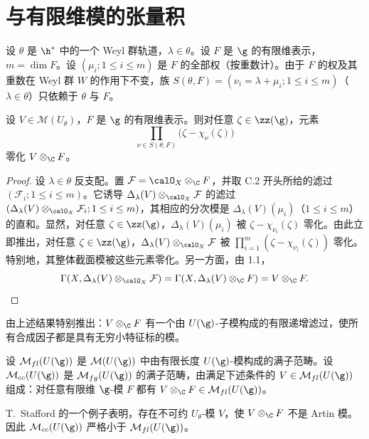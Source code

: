 \section{与有限维模的张量积}
\label{sec:03.3.7}

设 $\theta$ 是 $\h^*$ 中的一个 Weyl 群轨道，$\lambda\in\theta$。设 $F$ 是 $\g$ 的有限维表示，$m=\dim F$。设 $(\mu_i;1\le i\le m)$ 是 $F$ 的全部权（按重数计）。由于 $F$ 的权及其重数在 Weyl 群 $W$ 的作用下不变，族 $S(\theta,F)=(\nu_i=\lambda+\mu_i;1\le i\le m)$（$\lambda\in\theta$）只依赖于 $\theta$ 与 $F$。

\begin{lemma}\label{lem:03.7.1}
设 $V\in\mathcal{M}(U_\theta)$，$F$ 是 $\g$ 的有限维表示。则对任意 $\zeta\in\zz(\g)$，元素
$$\prod_{\nu\in S(\theta,F)}\bigl(\zeta-\chi_\nu(\zeta)\bigr)$$
零化 $V\otimes_\C F$。
\end{lemma}

\begin{proof}
设 $\lambda\in\theta$ 反支配。置 $\mathcal{F}=\calO_X\otimes_\C F$，并取 C.2 开头所给的滤过 $(\mathcal{F}_i;1\le i\le m)$。它诱导 $\Delta_\lambda(V)\otimes_{\calO_X}\mathcal{F}$ 的滤过 $(\Delta_\lambda(V)\otimes_{\calO_X}\mathcal{F}_i;1\le i\le m)$，其相应的分次模是 $\Delta_\lambda(V)(\mu_i)$（$1\le i\le m$）的直和。显然，对任意 $\zeta\in\zz(\g)$，$\Delta_\lambda(V)(\mu_i)$ 被 $\zeta-\chi_{\nu_i}(\zeta)$ 零化。由此立即推出，对任意 $\zeta\in\zz(\g)$，$\Delta_\lambda(V)\otimes_{\calO_X}\mathcal{F}$ 被 $\prod_{i=1}^m(\zeta-\chi_{\nu_i}(\zeta))$ 零化。特别地，其整体截面模被这些元素零化。另一方面，由 1.1，
$$\Gamma(X,\Delta_\lambda(V)\otimes_{\calO_X}\mathcal{F})=\Gamma(X,\Delta_\lambda(V)\otimes_\C F)=V\otimes_\C F.$$
\end{proof}

由上述结果特别推出：$V\otimes_\C F$ 有一个由 $U(\g)$-子模构成的有限递增滤过，使所有合成因子都是具有无穷小特征标的模。

设 $\mathcal{M}_{fl}(U(\g))$ 是 $\mathcal{M}(U(\g))$ 中由有限长度 $U(\g)$-模构成的满子范畴。设 $\mathcal{M}_{cc}(U(\g))$ 是 $\mathcal{M}_{fg}(U(\g))$ 的满子范畴，由满足下述条件的 $V\in\mathcal{M}_{fl}(U(\g))$ 组成：对任意有限维 $\g$-模 $F$ 都有 $V\otimes_\C F\in\mathcal{M}_{fl}(U(\g))$。

\begin{remark}\label{rem:03.7.2}
T.~Stafford 的一个例子表明，存在不可约 $U_\theta$-模 $V$，使 $V\otimes_\C F$ 不是 Artin 模。因此 $\mathcal{M}_{cc}(U(\g))$ 严格小于 $\mathcal{M}_{fl}(U(\g))$。
\end{remark}

